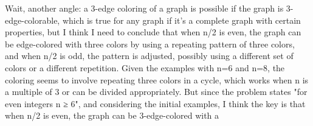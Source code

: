 Wait, another angle: a 3-edge coloring of a graph is possible if the graph is 3-edge-colorable, which is true for any graph if it's a complete graph with certain properties, but I think I need to conclude that when n/2 is even, the graph can be edge-colored with three colors by using a repeating pattern of three colors, and when n/2 is odd, the pattern is adjusted, possibly using a different set of colors or a different repetition. Given the examples with n=6 and n=8, the coloring seems to involve repeating three colors in a cycle, which works when n is a multiple of 3 or can be divided appropriately. But since the problem states "for even integers n ≥ 6", and considering the initial examples, I think the key is that when n/2 is even, the graph can be 3-edge-colored with a